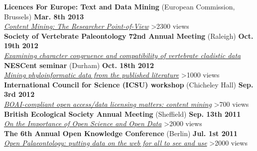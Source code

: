 \documentclass[margin,line]{resume}
\begin{document}
\begin{resume}
\textbf{Licences For Europe: Text and Data Mining} (European Commission, Brussels) \hfill \textbf{Mar. 8th 2013}\\
    \textsl{\href{http://www.slideshare.net/rossmounce/content-mining}{Content Mining: The Researcher Point-of-View}}  \hfill {\color{red}     	\textgreater 2300 views} \\ 

\vspace{-7 mm}     
\textbf{Society of Vertebrate Paleontology 72nd Annual Meeting} (Raleigh) \hfill \textbf{Oct. 19th 2012}\\
    \textsl{\href{http://prezi.com/4vwe4togkazh/svp2012/}{Examining character congruence and compatibility of vertebrate cladistic data}} \\ 

\vspace{-7 mm} 
\textbf{NESCent seminar} (Durham) \hfill \textbf{Oct. 18th 2012}\\
    \textsl{\href{http://prezi.com/k0xq0fmcfu7x/nescent-seminar-on-open-content-mining-for-phyloinformatic-data/}{Mining phyloinformatic data from the published literature}} \hfill {\color{red} 		\textgreater1000 views}\\

\vspace{-7 mm} 
 \textbf{International Council for Science (ICSU) workshop} (Chicheley Hall) \hfill \textbf{Sep. 3rd 2012}\\
    \textsl{\href{http://prezi.com/pdq4v-hhcc_2/boai-compliant-open-access-content-mining/}{BOAI-compliant open access/data licensing matters: content mining}} \hfill {\color{red} 		\textgreater 700 views}\\

\vspace{-7 mm}
     \textbf{British Ecological Society Annual Meeting} (Sheffield) \hfill \textbf{Sep. 13th 2011}\\
    \textsl{\href{http://prezi.com/jpr3ltvez2d8/on-the-importance-of-open-science-and-open-data/}{On the Importance of Open Science and Open Data}} \hfill {\color{red} 		\textgreater 2000 views}\\

\vspace{-7 mm} 
    \textbf{The 6th Annual Open Knowledge Conference} (Berlin) \hfill \textbf{Jul. 1st 2011}\\
    \textsl{\href{http://prezi.com/d9yztcafx_ag/open-palaeontology/}{Open Palaeontology: putting data on the web for all to see and use}} \hfill {\color{red} 		\textgreater 2000 views}
\newpage

\end{resume}
\end{document}
